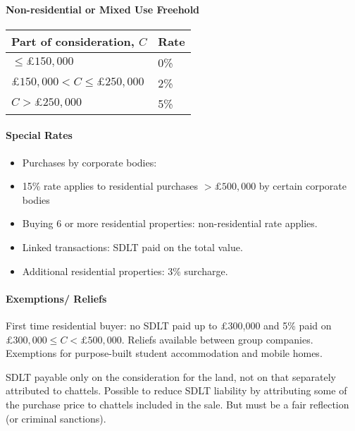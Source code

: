 \documentclass[
]{article}
\providecommand{\tightlist}{%
  \setlength{\itemsep}{0pt}\setlength{\parskip}{0pt}}
\begin{document}
\hypertarget{non-residential-or-mixed-use-freehold}{%
\paragraph{Non-residential or Mixed Use
Freehold}\label{non-residential-or-mixed-use-freehold}}

\begin{longtable}[]{@{}ll@{}}
\toprule()
Part of consideration, {\(C\)} & Rate \\
\midrule()
\endhead
{\(\leq \pounds 150,000\)} & 0\% \\
{\(\pounds 150,000 < C \leq \pounds 250,000\)} & 2\% \\
{\(C > \pounds 250,000\)} & 5\% \\
\bottomrule()
\end{longtable}

\hypertarget{special-rates}{%
\paragraph{Special Rates}\label{special-rates}}

\begin{itemize}
\tightlist
\item
  Purchases by corporate bodies:
\item
  15\% rate applies to residential purchases {\(> \pounds 500,000\)} by
  certain corporate bodies
\item
  Buying 6 or more residential properties: non-residential rate applies.
\item
  Linked transactions: SDLT paid on the total value.
\item
  Additional residential properties: 3\% surcharge.
\end{itemize}

\hypertarget{exemptions-reliefs}{%
\paragraph{Exemptions/ Reliefs}\label{exemptions-reliefs}}

First time residential buyer: no SDLT paid up to £300,000 and 5\% paid
on {\(\pounds 300,000 \leq C < \pounds 500,000\)}. Reliefs available
between group companies. Exemptions for purpose-built student
accommodation and mobile homes.

SDLT payable only on the consideration for the land, not on that
separately attributed to chattels. Possible to reduce SDLT liability by
attributing some of the purchase price to chattels included in the sale.
But must be a fair reflection (or criminal sanctions).
\end{document}
